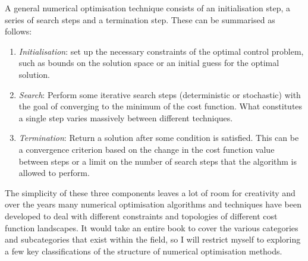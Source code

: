 A general numerical optimisation technique consists of an initialisation step, a series of search steps and a termination step. These can be summarised as follows:
\begin{enumerate}
    \item \emph{Initialisation}: set up the necessary constraints of the optimal control problem, such as bounds on the solution space or an initial guess for the optimal solution.
    \item \emph{Search}: Perform some iterative search steps (deterministic or stochastic) with the goal of converging to the minimum of the cost function. What constitutes a single step varies massively between different techniques.
    \item \emph{Termination}: Return a solution after some condition is satisfied. This can be a convergence criterion based on the change in the cost function value between steps or a limit on the number of search steps that the algorithm is allowed to perform.
\end{enumerate}

The simplicity of these three components leaves a lot of room for creativity and over the years many numerical optimisation algorithms and techniques have been developed to deal with different constraints and topologies of different cost function landscapes. It would take an entire book to cover the various categories and subcategories that exist within the field, so I will restrict myself to exploring a few key classifications of the structure of numerical optimisation methods. 

